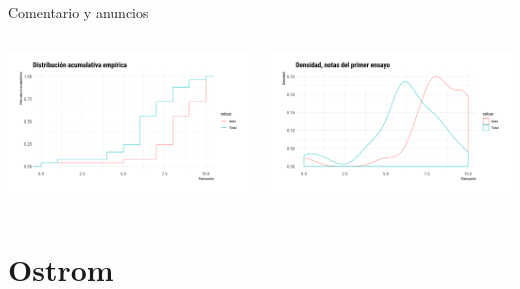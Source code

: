 \documentclass[11pt, aspectratio=169, compress]{beamer}
\begin{document}
\begin{frame}{Comentario y anuncios}
\begin{columns}
	\begin{column}{0.5\textwidth}
		\begin{center}
		\includegraphics[width=1.1\textwidth]{fig1}
		\end{center}
	\end{column}
	\begin{column}{0.5\textwidth}  %
		\begin{center}
			\includegraphics[width=1.1\textwidth]{fig2}
		\end{center}
	\end{column}
\end{columns}
\end{frame}
\section{Ostrom}
\end{document}
